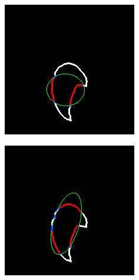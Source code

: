 \begin{figure}[h]
    \centering
    \begin{subfigure}{0.3\textwidth}
        \centering
        \includegraphics[width=0.9\linewidth]{plots/ransac/test_mask98.png}

    \end{subfigure}%
    \hfill
    \begin{subfigure}{0.3\textwidth}
        \centering
        \includegraphics[width=0.9\linewidth]{plots/ransac/test_mask186.png}


\end{subfigure}
\end{figure}
